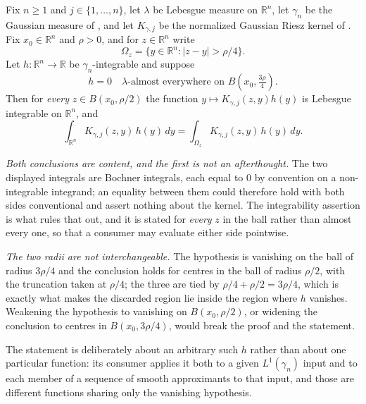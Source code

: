 \begin{lemma}
Fix $n \geq 1$ and $j \in \{1,\ldots,n\}$, let $\lambda$ be Lebesgue measure on
$\mathbb{R}^n$, let $\gamma_n$ be the Gaussian measure of , and let
$K_{\gamma,j}$ be the normalized Gaussian Riesz kernel of .  Fix
$x_0 \in \mathbb{R}^n$ and $\rho > 0$, and for $z \in \mathbb{R}^n$ write
\[
  \Omega_z = \{y \in \mathbb{R}^n : |z-y| > \rho/4\} .
\]
Let $h : \mathbb{R}^n \to \mathbb{R}$ be $\gamma_n$-integrable and suppose
\[
  h = 0 \quad \lambda\text{-almost everywhere on } B(x_0,\tfrac{3\rho}{4}) .
\]
Then for \emph{every} $z \in B(x_0,\rho/2)$ the function $y \mapsto K_{\gamma,j}(z,y)h(y)$ is
Lebesgue integrable on $\mathbb{R}^n$, and
\[
  \int_{\mathbb{R}^n}K_{\gamma,j}(z,y)\,h(y)\,dy
    = \int_{\Omega_z}K_{\gamma,j}(z,y)\,h(y)\,dy .
\]

\emph{Both conclusions are content, and the first is not an afterthought.}  The two displayed
integrals are Bochner integrals, each equal to $0$ by convention on a non-integrable integrand;
an equality between them could therefore hold with both sides conventional and assert nothing
about the kernel.  The integrability assertion is what rules that out, and it is stated for
\emph{every} $z$ in the ball rather than almost every one, so that a consumer may evaluate
either side pointwise.

\emph{The two radii are not interchangeable.}  The hypothesis is vanishing on the ball of
radius $3\rho/4$ and the conclusion holds for centres in the ball of radius $\rho/2$, with the
truncation taken at $\rho/4$; the three are tied by $\rho/4 + \rho/2 = 3\rho/4$, which is
exactly what makes the discarded region lie inside the region where $h$ vanishes.  Weakening the
hypothesis to vanishing on $B(x_0,\rho/2)$, or widening the conclusion to centres in
$B(x_0,3\rho/4)$, would break the proof and the statement.

The statement is deliberately about an arbitrary such $h$ rather than about one particular
function: its consumer applies it both to a given $L^1(\gamma_n)$ input and to each member of a
sequence of smooth approximants to that input, and those are different functions sharing only
the vanishing hypothesis.
\end{lemma}
